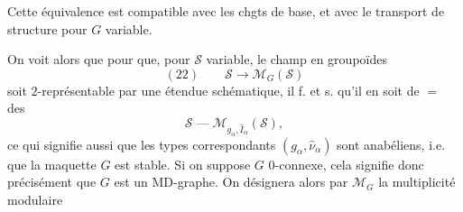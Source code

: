 Cette équivalence est compatible avec les chgts de base, et avec le transport de structure pour $G$ variable.

On voit alors que pour que, pour $\mathcal S$ variable, le champ en groupoïdes
\[
(22)\qquad\mathcal S\longrightarrow\mathcal M_G(\mathcal S)
\]
soit $2$-représentable par une étendue schématique, il f. et s. qu'il en soit de $=$ des
\[
\mathcal S\;\text{---}\;\mathcal M_{g_\alpha,\widehat I_\alpha}(\mathcal S),
\]
ce qui signifie aussi que les types correspondants $(g_\alpha,\widehat\nu_\alpha)$ sont anabéliens, i.e. que la maquette $G$ est stable. Si on suppose  $G$ $0$-connexe, cela signifie donc précisément que $G$ est un MD-graphe. On désignera alors par $\mathcal M_G$ la multiplicité modulaire
